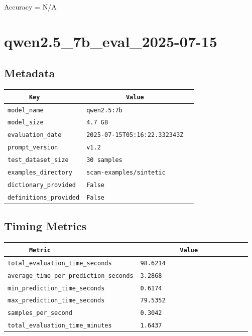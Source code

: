 \documentclass{article}
\begin{document}
\begin{center}
Accuracy = N/A
\end{center}

\section{qwen2.5\_7b\_eval\_2025-07-15}
\subsection{Metadata}

\begin{center}
\begin{tabular}{l | l} \hline
    \verb|      Key      | & \verb|           Value           | \\ \hline
    \hline
    \verb|model_name    | & \verb|qwen2.5:7b                   | \\ \hline
    \verb|model_size    | & \verb|4.7 GB                       | \\ \hline
    \verb|evaluation_date| & \verb|2025-07-15T05:16:22.332343Z  | \\ \hline
    \verb|prompt_version| & \verb|v1.2                         | \\ \hline
    \verb|test_dataset_size| & \verb|30 samples                   | \\ \hline
    \verb|examples_directory| & \verb|scam-examples/sintetic       | \\ \hline
    \verb|dictionary_provided| & \verb|False                        | \\ \hline
    \verb|definitions_provided| & \verb|False                        | \\ \hline
\end{tabular}
\end{center}

\subsection{Timing Metrics}

\begin{center}
\begin{tabular}{l | l} \hline
    \verb|      Metric     | & \verb|           Value           | \\ \hline
    \hline
    \verb|total_evaluation_time_seconds| & \verb|98.6214                      | \\ \hline
    \verb|average_time_per_prediction_seconds| & \verb|3.2868                       | \\ \hline
    \verb|min_prediction_time_seconds| & \verb|0.6174                       | \\ \hline
    \verb|max_prediction_time_seconds| & \verb|79.5352                      | \\ \hline
    \verb|samples_per_second| & \verb|0.3042                       | \\ \hline
    \verb|total_evaluation_time_minutes| & \verb|1.6437                       | \\ \hline
\end{tabular}
\end{center}
\end{document}
